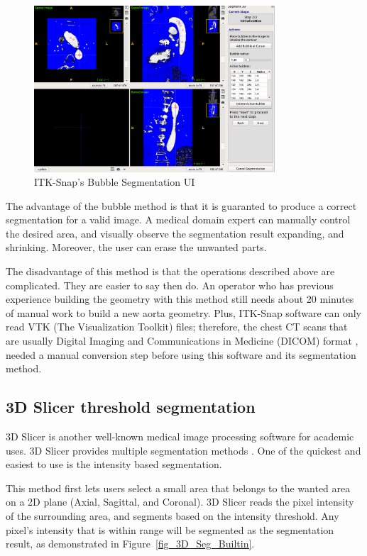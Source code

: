\begin{figure}[ht]
    \centering
    \includegraphics[width=0.8\textwidth]{figures/AGR/bubbles.png}
    \caption[ITK-Snap's Bubble Segmentation UI]{ITK-Snap's Bubble Segmentation UI \cite{py06nimg}}
    \label{fig_ITK}
\end{figure}

The advantage of the bubble method is that it is guaranted to produce a correct segmentation for a valid image. A medical domain expert can manually control the desired area, and visually observe the segmentation result expanding, and shrinking. Moreover, the user can erase the unwanted parts.

The disadvantage of this method is that the operations described above are complicated. They are easier to say then do. An operator who has previous experience building the geometry with this method still needs about 20 minutes of manual work to build a new aorta geometry. Plus, ITK-Snap software can only read VTK (The Visualization Toolkit) files; therefore, the chest CT scans that are usually Digital Imaging and Communications in Medicine (DICOM) format \cite{10.1007/978-1-4020-8752-3_13}, needed a manual conversion step before using this software and its segmentation method.

\subsection{3D Slicer threshold segmentation}
3D Slicer is another well-known medical image processing software for academic uses. 3D Slicer provides multiple segmentation methods \cite{Slicer_Wiki}. One of the quickest and easiest to use is the intensity based segmentation.

This method first lets users select a small area that belongs to the wanted area on a 2D plane (Axial, Sagittal, and Coronal). 3D Slicer reads the pixel intensity of the surrounding area, and segments based on the intensity threshold. Any pixel's intensity that is within range will be segmented as the segmentation result, as demonstrated in Figure~\ref{fig_3D_Seg_Builtin}. 

